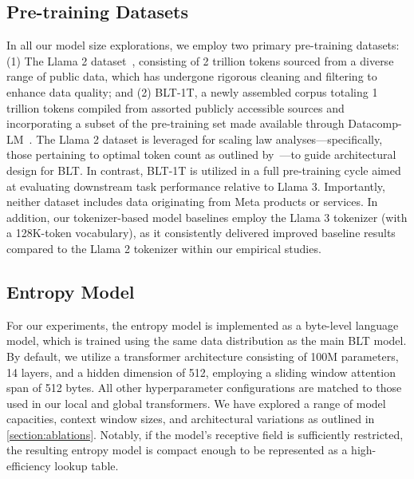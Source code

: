 \subsection{Pre-training Datasets} In all our model size explorations, we employ two primary pre-training datasets: (1) The Llama 2 dataset~\citep{touvron2023llama}, consisting of 2 trillion tokens sourced from a diverse range of public data, which has undergone rigorous cleaning and filtering to enhance data quality; and (2) {\textsc BLT}-1T, a newly assembled corpus totaling 1 trillion tokens compiled from assorted publicly accessible sources and incorporating a subset of the pre-training set made available through Datacomp-LM~\citep{li2024datacomp}. The Llama 2 dataset is leveraged for scaling law analyses—specifically, those pertaining to optimal token count as outlined by~\cite{dubey2024llama}—to guide architectural design for {\textsc BLT}. In contrast, {\textsc BLT}-1T is utilized in a full pre-training cycle aimed at evaluating downstream task performance relative to Llama 3. Importantly, neither dataset includes data originating from Meta products or services. In addition, our tokenizer-based model baselines employ the Llama 3 tokenizer (with a 128K-token vocabulary), as it consistently delivered improved baseline results compared to the Llama 2 tokenizer within our empirical studies.

\subsection{Entropy Model} For our experiments, the entropy model is implemented as a byte-level language model, which is trained using the same data distribution as the main {\textsc BLT} model. By default, we utilize a transformer architecture consisting of 100M parameters, 14 layers, and a hidden dimension of 512, employing a sliding window attention span of 512 bytes. All other hyperparameter configurations are matched to those used in our local and global transformers. We have explored a range of model capacities, context window sizes, and architectural variations as outlined in \autoref{section:ablations}. Notably, if the model's receptive field is sufficiently restricted, the resulting entropy model is compact enough to be represented as a high-efficiency lookup table.

